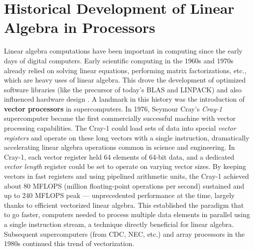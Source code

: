 \section{Historical Development of Linear Algebra in Processors} 
Linear algebra computations have been important in computing since the early days of digital computers. Early scientific computing in the 1960s and 1970s already relied on solving linear equations, performing matrix factorizations, etc., which are heavy uses of linear algebra. This drove the development of optimized software libraries (like the precursor of today’s BLAS and LINPACK) and also influenced hardware design \cite{dongarra1988extended}. A landmark in this history was the introduction of \textbf{vector processors} in supercomputers. In 1976, Seymour Cray’s \emph{Cray-1} supercomputer became the first commercially successful machine with vector processing capabilities\cite{cray1978cray1}. The Cray-1 could load sets of data into special \emph{vector registers} and operate on these long vectors with a single instruction, dramatically accelerating linear algebra operations common in science and engineering. In Cray-1, each vector register held 64 elements of 64-bit data, and a dedicated \emph{vector length} register could be set to operate on varying vector sizes. By keeping vectors in fast registers and using pipelined arithmetic units, the Cray-1 achieved about 80 MFLOPS (million floating-point operations per second) sustained and up to 240 MFLOPS peak — unprecedented performance at the time, largely thanks to efficient vectorized linear algebra. This established the paradigm that to go faster, computers needed to process multiple data elements in parallel using a single instruction stream, a technique directly beneficial for linear algebra. Subsequent supercomputers (from CDC, NEC, etc.) and array processors in the 1980s continued this trend of vectorization.

